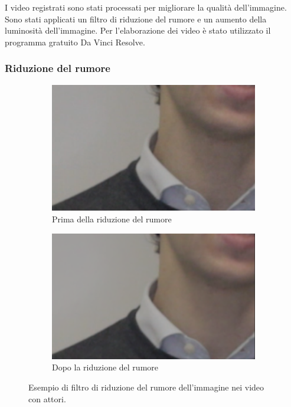 I video registrati sono stati processati per migliorare la qualità dell'immagine. Sono stati applicati un filtro di riduzione del rumore e un aumento della luminosità dell'immagine. Per l'elaborazione dei video è stato utilizzato il programma gratuito Da Vinci Resolve.

\subsubsection{Riduzione del rumore}

\begin{figure}[t]
    \centering
    \begin{subfigure}{0.49\textwidth}
        \includegraphics[width=0.95\linewidth]{images/before_nr} 
        \caption{Prima della riduzione del rumore}
        \label{fig:before_nr}
    \end{subfigure}
    \hfill
    \begin{subfigure}{0.49\textwidth}
        \includegraphics[width=0.95\linewidth]{images/after_nr}
        \caption{Dopo la riduzione del rumore}
        \label{fig:after_nr}
    \end{subfigure}
    \hfill
    \caption{Esempio di filtro di riduzione del rumore dell'immagine nei video con attori.}
    \label{fig:noise_reduction}
\end{figure}

